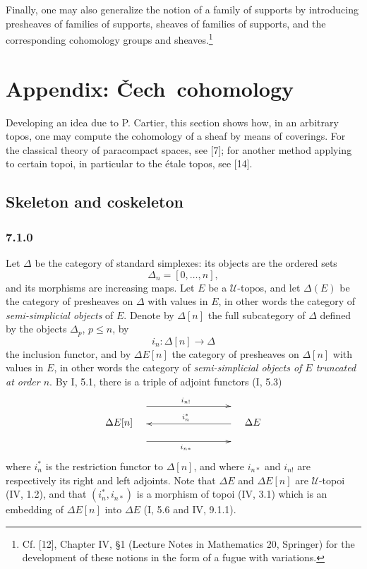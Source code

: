 \documentclass[11pt]{article}
\newcommand{\U}{\mathcal{U}}
\newcommand{\Cech}{\v{C}ech}
\begin{document}
Finally, one may also generalize the notion of a family of supports by introducing presheaves of families of supports, sheaves of families of supports, and the corresponding cohomology groups and sheaves.\footnote{Cf. [12], Chapter IV, \S1 (Lecture Notes in Mathematics 20, Springer) for the development of these notions in the form of a fugue with variations.}

\section{Appendix: \Cech\ cohomology}

Developing an idea due to P. Cartier, this section shows how, in an arbitrary topos, one may compute the cohomology of a sheaf by means of coverings. For the classical theory of paracompact spaces, see [7]; for another method applying to certain topoi, in particular to the \'{e}tale topos, see [14].

\subsection{Skeleton and coskeleton}

\subsubsection*{7.1.0}
Let $\Delta$ be the category of standard simplexes: its objects are the ordered sets
\[
        \Delta_n=[0,\ldots,n],
\]
and its morphisms are increasing maps. Let $E$ be a $\U$-topos, and let $\Delta(E)$ be the category of presheaves on $\Delta$ with values in $E$, in other words the category of \emph{semi-simplicial objects} of $E$. Denote by $\Delta[n]$ the full subcategory of $\Delta$ defined by the objects $\Delta_p$, $p\leq n$, by
\[
        i_n:\Delta[n]\to\Delta
\]
the inclusion functor, and by $\Delta E[n]$ the category of presheaves on $\Delta[n]$ with values in $E$, in other words the category of \emph{semi-simplicial objects of $E$ truncated at order $n$}. By I, 5.1, there is a triple of adjoint functors (I, 5.3)
\[
\xymatrix@C=3cm@M=.5cm{
\Delta E[n] \ar@<17pt>[r]^{i_{n!}} \ar@<-19pt>[r]_{i_{n*}}&
\Delta E \ar@<1pt>[l]_{i_n^*}
}
\]
where $i_n^*$ is the restriction functor to $\Delta[n]$, and where $i_{n*}$ and $i_{n!}$ are respectively its right and left adjoints. Note that $\Delta E$ and $\Delta E[n]$ are $\U$-topoi (IV, 1.2), and that $(i_n^*,i_{n*})$ is a morphism of topoi (IV, 3.1) which is an embedding of $\Delta E[n]$ into $\Delta E$ (I, 5.6 and IV, 9.1.1).
\end{document}
